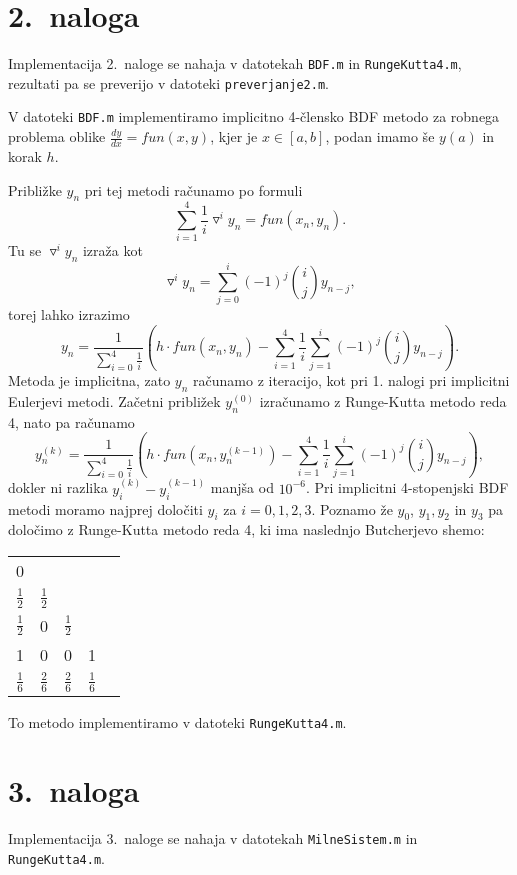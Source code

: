 \documentclass[a4paper,12pt]{article}
\newcommand{\todo}[1]{{\color{red}{#1}}}
\begin{document}
\todo{rezultati}

\section*{2.\ naloga}

Implementacija 2.\ naloge se nahaja v datotekah 
\texttt{BDF.m} in \texttt{RungeKutta4.m}, rezultati pa se preverijo 
v datoteki \texttt{preverjanje2.m}.

V datoteki \texttt{BDF.m} implementiramo implicitno 4-člensko BDF
metodo za robnega problema oblike 
\(\frac{dy}{dx}=fun(x,y)\), kjer je \(x\in [a,b]\), podan imamo še \(y(a)\) in korak \(h\).

Približke $y_n$ pri tej metodi računamo po formuli 
$$\sum_{i=1}^4 \frac{1}{i} \triangledown^i y_n = fun(x_n,y_n).$$
Tu se $\triangledown^i y_n$ izraža kot
$$\triangledown^i y_n = \sum_{j=0}^i (-1)^j {i\choose j} y_{n-j},$$
torej lahko izrazimo 
$$y_n = \frac{1}{\sum_{i=0}^4 \frac{1}{i}}(h\cdot fun(x_n,y_n)-
\sum_{i=1}^4 \frac{1}{i}\sum_{j=1}^i (-1)^j{i \choose j}y_{n-j}).$$
Metoda je implicitna, zato $y_n$ računamo z iteracijo, kot pri 1. nalogi
pri implicitni Eulerjevi metodi. Začetni približek $y_n^(0)$ izračunamo
z Runge-Kutta metodo reda 4, nato pa računamo
$$y_n^(k) = \frac{1}{\sum_{i=0}^4 \frac{1}{i}}(h\cdot fun(x_n,y_n^(k-1))-
\sum_{i=1}^4 \frac{1}{i}\sum_{j=1}^i (-1)^j{i \choose j}y_{n-j}),$$
dokler ni razlika $y_i^{(k)}-y_i^{(k-1)}$ manjša od $10^{-6}$.
Pri implicitni 4-stopenjski BDF metodi moramo najprej določiti 
$y_i$ za $i=0,1,2,3$. Poznamo že $y_0$, $y_1, y_2$ in $y_3$ pa določimo
z Runge-Kutta metodo reda 4, ki ima naslednjo Butcherjevo shemo:
\begin{center}
    \begin{tabular}{c|cccc}
     0&  &  &  &  \\
     $\frac{1}{2}$ & $\frac{1}{2}$ &  &  &  \\
     $\frac{1}{2}$ & 0 & $\frac{1}{2}$ &  &  \\
     1 & 0 & 0 & 1 &  \\ \hline
     $\frac{1}{6}$ & $\frac{2}{6}$ & $\frac{2}{6}$ & $\frac{1}{6}$ & 
    \end{tabular}
\end{center}
To metodo implementiramo v datoteki \texttt{RungeKutta4.m}.
\todo{rezultati}

\section*{3.\ naloga}

Implementacija 3.\ naloge se nahaja v datotekah \texttt{MilneSistem.m}
in \texttt{RungeKutta4.m}. 
\end{document}
